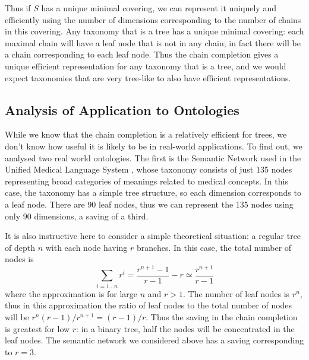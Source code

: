 \documentclass{report}
\begin{document}
Thus if $S$ has a unique minimal covering, we can represent it uniquely and efficiently using the number of dimensions corresponding to the number of chains in this covering. Any taxonomy that is a tree has a unique minimal covering: each maximal chain will have a leaf node that is not in any chain; in fact there will be a chain corresponding to each leaf node. Thus the chain completion gives a unique efficient representation for any taxonomy that is a tree, and we would expect taxonomies that are very tree-like to also have efficient representations.


\subsection{Analysis of Application to Ontologies}

While we know that the chain completion is a relatively efficient for trees, we don't know how useful it is likely to be in real-world applications. To find out, we analysed two real world ontologies. The first is the Semantic Network used in the Unified Medical Language System \citep{National:98}, whose taxonomy consists of just 135 nodes representing broad categories of meanings related to medical concepts. In this case, the taxonomy has a simple tree structure, so each dimension corresponds to a leaf node. There are 90 leaf nodes, thus we can represent the 135 nodes using only 90 dimensions, a saving of a third.

It is also instructive here to consider a simple theoretical situation: a regular tree of depth $n$ with each node having $r$ branches. In this case, the total number of nodes is
$$\sum_{i=1\ldots n} r^i = \frac{r^{n+1} - 1}{r - 1} - r \simeq \frac{r^{n+1}}{r - 1}$$
where the approximation is for large $n$ and $r > 1$. The number of leaf nodes is $r^n$, thus in this approximation the ratio of leaf nodes to the total number of nodes will be $r^n (r-1)/r^{n+1} = (r-1)/r$. Thus the saving in the chain completion is greatest for low $r$: in a binary tree, half the nodes will be concentrated in the leaf nodes. The semantic network we considered above has a saving corresponding to $r = 3$.
\end{document}
